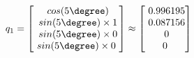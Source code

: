 \documentclass[preview]{standalone}
\begin{document}
\begin{center}
$q_1 = \begin{bmatrix}\
                    cos(5\degree) \\\
                    sin(5\degree) \times 1 \\\
                    sin(5\degree) \times 0 \\\
                    sin(5\degree) \times 0\
                \end{bmatrix} \approx \begin{bmatrix}\
                    0.996195 \\\
                    0.087156 \\\
                    0 \\\
                    0\
                \end{bmatrix}$
\end{center}
\end{document}
